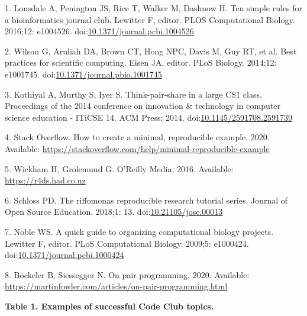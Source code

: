 \documentclass[
  11pt,
]{article}
\newenvironment{cslreferences}%
  {}%
  {\par}
\begin{document}
\hypertarget{refs}{}
\begin{cslreferences}
\leavevmode\hypertarget{ref-Lonsdale2016}{}%
1. Lonsdale A, Penington JS, Rice T, Walker M, Dashnow H. Ten simple
rules for a bioinformatics journal club. Lewitter F, editor. PLOS
Computational Biology. 2016;12: e1004526.
doi:\href{https://doi.org/10.1371/journal.pcbi.1004526}{10.1371/journal.pcbi.1004526}

\leavevmode\hypertarget{ref-Wilson2014}{}%
2. Wilson G, Aruliah DA, Brown CT, Hong NPC, Davis M, Guy RT, et al.
Best practices for scientific computing. Eisen JA, editor. PLoS Biology.
2014;12: e1001745.
doi:\href{https://doi.org/10.1371/journal.pbio.1001745}{10.1371/journal.pbio.1001745}

\leavevmode\hypertarget{ref-Kothiyal2014}{}%
3. Kothiyal A, Murthy S, Iyer S. Think-pair-share in a large CS1 class.
Proceedings of the 2014 conference on innovation \& technology in
computer science education - ITiCSE 14. ACM Press; 2014.
doi:\href{https://doi.org/10.1145/2591708.2591739}{10.1145/2591708.2591739}

\leavevmode\hypertarget{ref-StackOverflow_MREE}{}%
4. Stack Overflow. How to create a minimal, reproducible example. 2020.
Available:
\url{https://stackoverflow.com/help/minimal-reproducible-example}

\leavevmode\hypertarget{ref-Wickham_2016}{}%
5. Wickham H, Grolemund G. O'Reilly Media; 2016. Available:
\url{https://r4ds.had.co.nz}

\leavevmode\hypertarget{ref-Schloss_2018}{}%
6. Schloss PD. The riffomonas reproducible research tutorial series.
Journal of Open Source Education. 2018;1: 13.
doi:\href{https://doi.org/10.21105/jose.00013}{10.21105/jose.00013}

\leavevmode\hypertarget{ref-Noble2009}{}%
7. Noble WS. A quick guide to organizing computational biology projects.
Lewitter F, editor. PLoS Computational Biology. 2009;5: e1000424.
doi:\href{https://doi.org/10.1371/journal.pcbi.1000424}{10.1371/journal.pcbi.1000424}

\leavevmode\hypertarget{ref-Bockeler_2020}{}%
8. Böckeler B, Siessegger N. On pair programming. 2020. Available:
\url{https://martinfowler.com/articles/on-pair-programming.html}
\end{cslreferences}

\newpage

\textbf{Table 1. Examples of successful Code Club topics.}
\end{document}
